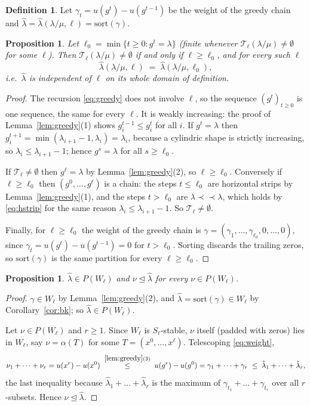 \documentclass[11pt]{article}
\theoremstyle{plain}
\newtheorem{prop}[thm]{Proposition}
\theoremstyle{definition}
\newtheorem{defn}[thm]{Definition}
\newcommand{\hstrip}{\prec\!\!\prec}
\begin{document}
\begin{defn}
Let $\gamma_t=u(g^{t})-u(g^{t-1})$ be the weight of the greedy chain and
$\hat\lambda=\hat\lambda(\lambda/\mu,\ell)=\mathrm{sort}(\gamma)$.
\end{defn}

\begin{prop}\label{prop:noell}
Let $\ell_0=\min\{t\ge 0: g^{t}=\lambda\}$ (finite whenever
$\mathcal{T}_\ell(\lambda/\mu)\ne\emptyset$ for some $\ell$). Then
$\mathcal{T}_\ell(\lambda/\mu)\ne\emptyset$ if and only if $\ell\ge\ell_0$, and for every
such $\ell$
\[
  \hat\lambda(\lambda/\mu,\ell)\;=\;\hat\lambda(\lambda/\mu,\ell_0),
\]
i.e.\ $\hat\lambda$ is independent of $\ell$ on its whole domain of definition.
\end{prop}

\begin{proof}
The recursion \eqref{eq:greedy} does not involve $\ell$, so the sequence
$(g^{t})_{t\ge0}$ is one sequence, the same for every $\ell$. It is weakly increasing: the
proof of Lemma~\ref{lem:greedy}(1) shows $g^{t-1}_i\le g^{t}_i$ for all $i$. If $g^{t}=\lambda$
then $g^{t+1}_i=\min(\lambda_{i+1}-1,\lambda_i)=\lambda_i$, because a cylindric shape is
strictly increasing, so $\lambda_i\le\lambda_{i+1}-1$; hence $g^{s}=\lambda$ for all
$s\ge\ell_0$.

If $\mathcal{T}_\ell\ne\emptyset$ then $g^{\ell}=\lambda$ by Lemma~\ref{lem:greedy}(2), so
$\ell\ge\ell_0$. Conversely if $\ell\ge\ell_0$ then $(g^0,\dots,g^{\ell})$ is a chain: the
steps $t\le\ell_0$ are horizontal strips by Lemma~\ref{lem:greedy}(1), and the steps
$t>\ell_0$ are $\lambda\hstrip\lambda$, which holds by \eqref{eq:hstrip} for the same reason
$\lambda_i\le\lambda_{i+1}-1$. So $\mathcal{T}_\ell\ne\emptyset$.

Finally, for $\ell\ge\ell_0$ the weight of the greedy chain is
$\gamma=(\gamma_1,\dots,\gamma_{\ell_0},0,\dots,0)$, since $\gamma_t=u(g^{t})-u(g^{t-1})=0$ for
$t>\ell_0$. Sorting discards the trailing zeros, so
$\mathrm{sort}(\gamma)$ is the same partition for every $\ell\ge\ell_0$.
\end{proof}

\begin{prop}\label{prop:max}
$\hat\lambda\in P(W_\ell)$ and $\nu\trianglelefteq\hat\lambda$ for every $\nu\in P(W_\ell)$.
\end{prop}

\begin{proof}
$\gamma\in W_\ell$ by Lemma~\ref{lem:greedy}(2), and $\hat\lambda=\mathrm{sort}(\gamma)\in
W_\ell$ by Corollary~\ref{cor:bk}; so $\hat\lambda\in P(W_\ell)$.

Let $\nu\in P(W_\ell)$ and $r\ge 1$. Since $W_\ell$ is $S_\ell$-stable,
$\nu$ itself (padded with zeros) lies in $W_\ell$, say $\nu=\alpha(T)$ for some
$T=(x^0,\dots,x^\ell)$. Telescoping \eqref{eq:weight},
\[
  \nu_1+\dots+\nu_r=u(x^{r})-u(x^{0})\;\overset{\ref{lem:greedy}(3)}{\le}\;u(g^{r})-u(g^{0})
  =\gamma_1+\dots+\gamma_r\;\le\;\hat\lambda_1+\dots+\hat\lambda_r,
\]
the last inequality because $\hat\lambda_1+\dots+\hat\lambda_r$ is the maximum of
$\gamma_{t_1}+\dots+\gamma_{t_r}$ over all $r$-subsets. Hence
$\nu\trianglelefteq\hat\lambda$.
\end{proof}
\end{document}
